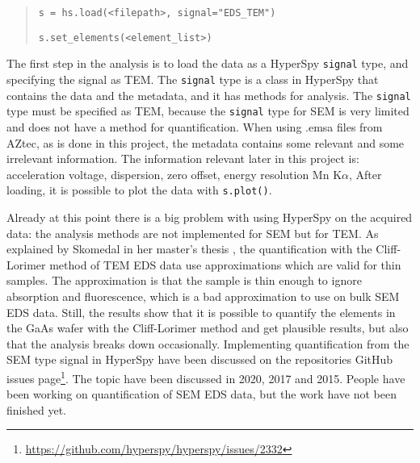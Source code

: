 \begin{quote}
    \verb|s = hs.load(<filepath>, signal="EDS_TEM")|

    \verb|s.set_elements(<element_list>)|
\end{quote}

The first step in the analysis is to load the data as a HyperSpy \verb|signal| type, and specifying the signal as TEM.
The \verb|signal| type is a class in HyperSpy that contains the data and the metadata, and it has methods for analysis.
The \verb|signal| type must be specified as TEM, because the \verb|signal| type for SEM is very limited and does not have a method for quantification.
When using .emsa files from AZtec, as is done in this project, the metadata contains some relevant and some irrelevant information.
The information relevant later in this project is:
acceleration voltage, dispersion, zero offset, energy resolution Mn K$\alpha$,
After loading, it is possible to plot the data with \verb|s.plot()|.

Already at this point there is a big problem with using HyperSpy on the acquired data: the analysis methods are not implemented for SEM but for TEM.
As explained by Skomedal in her master's thesis \cite{skomedal_improving_2022}, the quantification with the Cliff-Lorimer method of TEM EDS data use approximations which are valid for thin samples.
The approximation is that the sample is thin enough to ignore absorption and fluorescence, which is a bad approximation to use on bulk SEM EDS data.
Still, the results show that it is possible to quantify the elements in the GaAs wafer with the Cliff-Lorimer method and get plausible results, but also that the analysis breaks down occasionally. %
Implementing quantification from the SEM type signal in HyperSpy have been discussed on the repositories GitHub issues page\footnote{\url{https://github.com/hyperspy/hyperspy/issues/2332}}.
The topic have been discussed in 2020, 2017 and 2015.
People have been working on quantification of SEM EDS data, but the work have not been finished yet.




